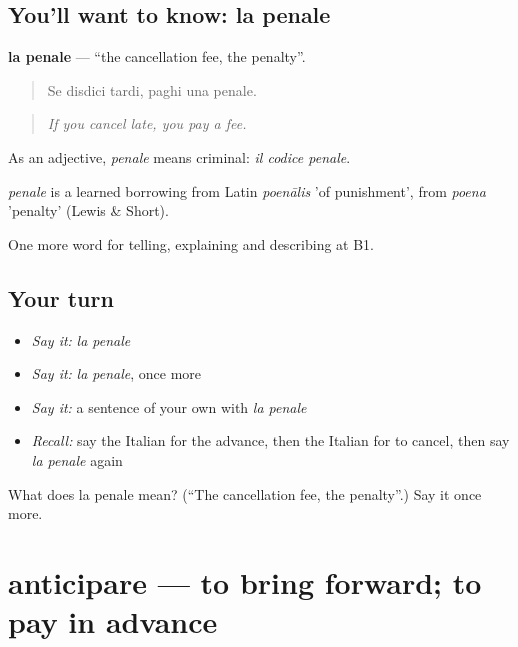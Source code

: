 \subsection*{You'll want to know: la penale}
\textbf{la penale} — \textquotedblleft{}the cancellation fee, the penalty\textquotedblright{}.

\begin{quote}
Se disdici tardi, paghi una penale.
\end{quote}

\begin{quote}
\emph{If you cancel late, you pay a fee.}
\end{quote}

As an adjective, \emph{penale} means criminal: \emph{il codice penale}.

\begin{cousinweb}
\emph{penale} is a learned borrowing from Latin \emph{poenālis} 'of punishment', from \emph{poena} 'penalty' (Lewis \& Short).
\end{cousinweb}

\begin{grammarlens}[title={What you've built}]
One more word for telling, explaining and describing at B1.
\end{grammarlens}

\subsection*{Your turn}
\begin{itemize}
\raggedright
  \item \emph{Say it:} \emph{la penale}
  \item \emph{Say it:} \emph{la penale}, once more
  \item \emph{Say it:} a sentence of your own with \emph{la penale}
  \item \emph{Recall:} say the Italian for the advance, then the Italian for to cancel, then say \emph{la penale} again
\end{itemize}

\begin{tcolorbox}[breakable,colback=teal!4,colframe=teal!35!black,title={Before you move on}]
What does la penale mean? (\textquotedblleft{}The cancellation fee, the penalty\textquotedblright{}.) Say it once more.
\end{tcolorbox}
\section[anticipare]{anticipare — to bring forward; to pay in advance}

